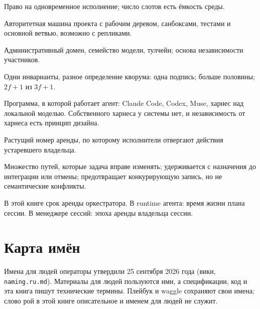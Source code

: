 \begin{description}[leftmargin=0pt,labelindent=0pt,itemsep=3pt,font=\sffamily\bfseries]
\item[Слот] Право на одновременное исполнение; число слотов есть ёмкость среды.
\item[Среда исполнения] Авторитетная машина проекта с рабочим деревом, санбоксами, тестами и основной ветвью, возможно с репликами.
\item[Три оси] Административный домен, семейство модели, тулчейн; основа независимости участников.
\item[Уровни доверия L0, L1, L2] Одни инварианты, разное определение кворума: одна подпись; больше половины; $2f+1$ из $3f+1$.
\item[Харнес] Программа, в которой работает агент: Claude Code, Codex, Muse, харнес над локальной моделью. Собственного харнеса у системы нет, и независимость от харнеса есть принцип дизайна.
\item[Fencing-токен] Растущий номер аренды, по которому исполнители отвергают действия устаревшего владельца.
\item[Write scope] Множество путей, которые задача вправе изменять; удерживается с назначения до интеграции или отмены; предотвращает конкурирующую запись, но не семантические конфликты.
\item[Эпоха] В этой книге срок аренды оркестратора. В runtime агента: время жизни плана сессии. В менеджере сессий: эпоха аренды владельца сессии.
\end{description}

\section*{Карта имён}

Имена для людей операторы утвердили 25 сентября 2026 года (вики, \texttt{naming.ru.md}). Материалы для людей пользуются ими, а спецификации, код и эта книга пишут технические термины. Плейбук и waggle сохраняют свои имена; слово рой в этой книге описательное и именем для людей не служит.

